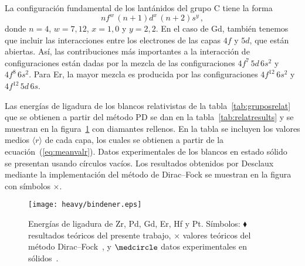 La configuración fundamental de los lantánidos del grupo C tiene la 
forma 
\begin{equation}
nf^w\,(n+1)d^x\,(n+2)s^y\,,
\end{equation}
donde $n=4$, $w=7,12$, $x=1,0$ y $y=2,2$. En el caso de Gd, también 
tenemos que incluir las interacciones entre los electrones de las capas
$4f$ y $5d$, que están abiertas. Así, las contribuciones más 
importantes a la interacción de configuraciones están dadas por la 
mezcla de las configuraciones $4f^7\,5d\,6s^2$ y $4f^8\,6s^2$.
Para Er, la mayor mezcla es producida por las configuraciones 
$4f^{12}\,6s^2$ y $4f^{12}\,5d\,6s$.

Las energías de ligadura de los blancos relativistas de la tabla~\ref{tab:gruposrelat} que se obtienen a partir del método PD se 
dan en la tabla~\ref{tab:relatresults} y se muestran en la 
figura~\ref{fig:bindener} con diamantes rellenos. En la tabla se 
incluyen los valores medios $\langle r\rangle$ de cada capa, los cuales 
se obtienen a partir de la ecuación~(\ref{eq:meanvalr}). Datos 
experimentales de los blancos en estado sólido~\cite{Williams:95} se 
presentan usando círculos vacíos. Los resultados obtenidos por 
Desclaux~\cite{Desclaux:73} mediante la implementación del método 
de Dirac--Fock se muestran en la figura con símbolos $\times$.

\begin{figure}[t]
\centering
\texttt{[image: heavy/bindener.eps]}
\caption[Energías de ligadura de blancos relativistas]
{Energías de ligadura de Zr, Pd, Gd, Er, Hf y Pt. Símbolos: 
$\blacklozenge$ resultados teóricos del presente trabajo, 
$\times$ valores teóricos del método Dirac--Fock~\cite{Desclaux:73}, y 
$\medcircle$ datos experimentales en sólidos~\cite{Williams:95}.}
\label{fig:bindener}
\end{figure}

